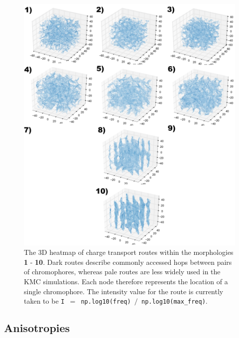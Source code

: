 \documentclass[12pt]{article}
\begin{document}
\begin{figure}[h!]\centering
	\includegraphics[width=\textwidth]{Figures/3dHole.pdf}
    \caption{The 3D heatmap of charge transport routes within the morphologies \textbf{1} - \textbf{10}.
    Dark routes describe commonly accessed hops between pairs of chromophores, whereas pale routes are less widely used in the KMC simulations.
    Each node therefore represents the location of a single chromophore.
The intensity value for the route is currently taken to be \texttt{I $=$ np.log10(freq) $/$ np.log10(max\_freq)}.}
	\label{fig:3dNetwork}
\end{figure}

\clearpage
\subsection{Anisotropies}
\end{document}
